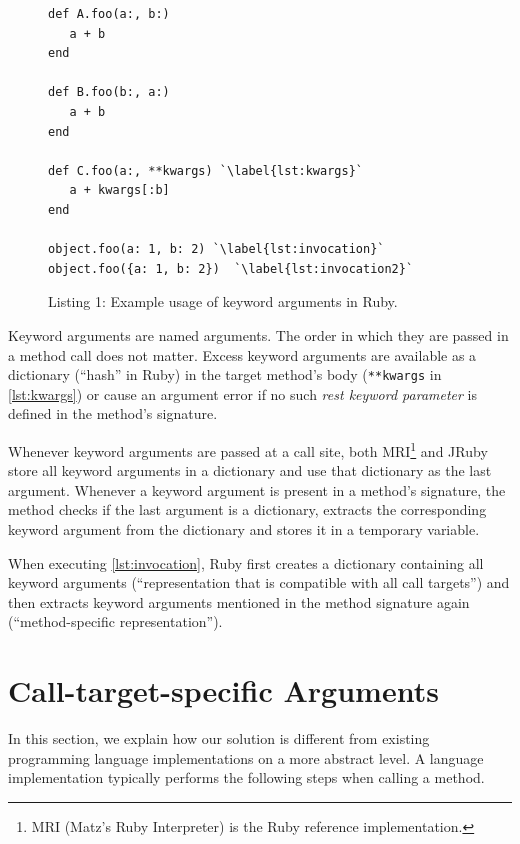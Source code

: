 \documentclass{sigplanconf} %
\begin{document}
\begin{figure}[!hbp] %
\begin{lstlisting}[basicstyle=\footnotesize\ttfamily] 
def A.foo(a:, b:)
   a + b
end

def B.foo(b:, a:)
   a + b
end

def C.foo(a:, **kwargs) `\label{lst:kwargs}`
   a + kwargs[:b]
end

object.foo(a: 1, b: 2) `\label{lst:invocation}`
object.foo({a: 1, b: 2})  `\label{lst:invocation2}`
\end{lstlisting}
\vspace{-0.25cm}
\caption*{Listing 1: Example usage of keyword arguments in Ruby.}
\end{figure}

Keyword arguments are named arguments. The order in which they are passed in a method call does not matter. Excess keyword arguments are available as a dictionary (``hash'' in Ruby) in the target method's body (\lstinline{**kwargs} in \autoref{lst:kwargs}) or cause an argument error if no such \emph{rest keyword parameter} is defined in the method's signature.

Whenever keyword arguments are passed at a call site, both MRI\footnote{MRI (Matz's Ruby Interpreter) is the Ruby reference implementation.} and JRuby store all keyword arguments in a dictionary and use that dictionary as the last argument. Whenever a keyword argument is present in a method's signature, the method checks if the last argument is a dictionary, extracts the corresponding keyword argument from the dictionary and stores it in a temporary variable.

When executing \autoref{lst:invocation}, Ruby first creates a dictionary containing all keyword arguments (``representation that is compatible with all call targets'') and then extracts keyword arguments mentioned in the method signature again (``method-specific representation'').


\section{Call-target-specific Arguments}
In this section, we explain how our solution is different from existing programming language implementations on a more abstract level. A language implementation typically performs the following steps when calling a method.
\end{document}
